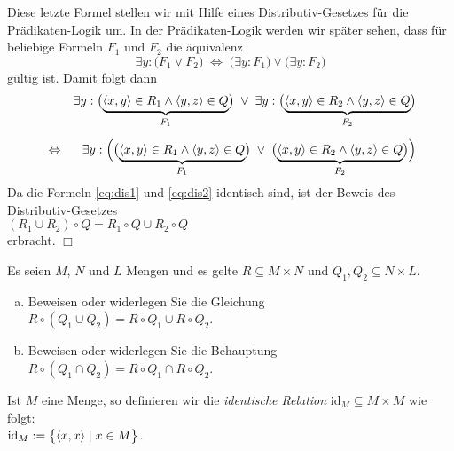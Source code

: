 Diese letzte Formel stellen wir mit Hilfe eines Distributiv-Gesetzes f\"{u}r die
Pr\"{a}dikaten-Logik um.  In der Pr\"{a}dikaten-Logik werden wir sp\"{a}ter sehen, dass f\"{u}r beliebige
Formeln $F_1$ und $F_2$ die \"{a}quivalenz
\[ \exists y: \bigl(F_1 \vee F_2\bigr) \;\Leftrightarrow\; \bigl(\exists y: F_1\bigr) \vee \bigl(\exists y: F_2\bigr) \]
g\"{u}ltig ist.  Damit folgt dann
\begin{eqnarray}
\nonumber
 & & \exists y: \bigl(\underbrace{\pair(x,y) \in R_1 \wedge \pair(y,z) \in Q}_{F_1}\bigr) \;\vee\; 
     \exists y: \bigl(\underbrace{\pair(x,y) \in R_2 \wedge \pair(y,z) \in Q}_{F_2}\bigr) \\[0.2cm]
  \label{eq:dis2}
 & \Leftrightarrow &
     \exists y: \Bigl(\bigl(\underbrace{\pair(x,y) \in R_1 \wedge \pair(y,z) \in Q}_{F_1}\bigr) \;\vee\; 
                \bigl(\underbrace{\pair(x,y) \in R_2 \wedge \pair(y,z) \in Q}_{F_2}\bigr)\Bigr) 
\end{eqnarray}
Da die Formeln \ref{eq:dis1} und \ref{eq:dis2} identisch sind, ist der Beweis des
Distributiv-Gesetzes 
\\[0.2cm]
\hspace*{1.3cm}
 $(R_1 \cup R_2) \circ Q = R_1 \circ Q \cup R_2 \circ Q$
\\[0.2cm]
erbracht. \hspace*{\fill} $\Box$
\vspace{0.2cm}

\exercise
Es seien $M$, $N$ und $L$ Mengen und es gelte $R \subseteq M \times N$ und $Q_1,Q_2 \subseteq N \times L$. 
\begin{enumerate}[(a)]
\item Beweisen oder widerlegen Sie die Gleichung
      \\[0.2cm]
      \hspace*{1.3cm}  $R \circ (Q_1 \cup Q_2) = R \circ Q_1 \cup R \circ Q_2$.
\item Beweisen oder widerlegen Sie die Behauptung 
      \\[0.2cm]
      \hspace*{1.3cm}
      $R \circ (Q_1 \cap Q_2) = R \circ Q_1 \cap R \circ Q_2$. \eox
\end{enumerate}


\begin{Definition}
  Ist $M$ eine Menge, so definieren wir die \emph{identische Relation} $\mathrm{id}_M \subseteq M \times M$
  wie folgt: \\[0.2cm]
  \hspace*{1.3cm} $\mathrm{id}_M := \bigl\{ \pair(x,x) \mid x \in M \bigr\}$.  \eox
\end{Definition}

